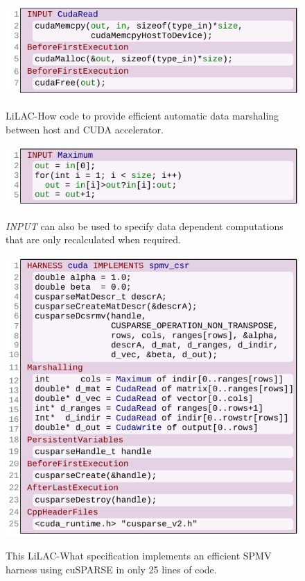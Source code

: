 \begin{figure}[t]
\centering
\includegraphics[width=0.944\linewidth]{figures/harness3.pdf}
\\[-0.75em]
\caption{LiLAC-How code to provide efficient automatic data marshaling between
         host and CUDA accelerator.}
\label{cudaread}
\end{figure}

\begin{figure}[t]
\includegraphics[width=0.944\linewidth]{figures/harness4.pdf}
\\[-0.75em]
\caption{{\em INPUT} can also be used to specify data dependent computations
         that are only recalculated when required.}
\vspace{0.5em}
\label{readablemax}
\end{figure}

\begin{figure}[t]
\includegraphics[width=0.944\linewidth]{figures/harness1.pdf}
\\[-0.75em]
\caption{This LiLAC-What specification implements an efficient SPMV harness
  using cuSPARSE in only 25 lines of code.}
\label{spmvharness}
\end{figure}

